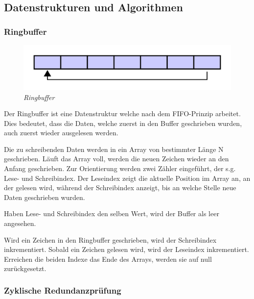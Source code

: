 \subsection{Datenstrukturen und Algorithmen}
\subsubsection{Ringbuffer}

\begin{figure}
     \vspace{-\baselineskip}
         \centering
         \includegraphics[scale=0.1]{Pictures/circular_buffer.png}
         \caption{\textit{Ringbuffer \citep{ImgBuffer}}}
         \label{img:Ringbuffer}
 \end{figure}

Der Ringbuffer ist eine Datenstruktur welche nach dem \acs{FIFO}-Prinzip arbeitet. Dies bedeutet, dass die Daten, welche
zuerst in den Buffer geschrieben wurden, auch zuerst wieder ausgelesen werden. 

\smallskip

Die zu schreibenden Daten werden in ein Array von bestimmter Länge N geschrieben. Läuft das Array voll, werden die neuen Zeichen
wieder an den Anfang geschrieben. Zur Orientierung werden zwei Zähler eingeführt, der s.g. Lese- und Schreibindex. Der Leseindex
zeigt die aktuelle Position im Array an, an der gelesen wird, während der Schreibindex anzeigt, bis an welche Stelle
neue Daten geschrieben wurden.  

Haben Lese- und Schreibindex den selben Wert, wird der Buffer als leer angesehen. 

\smallskip

Wird ein Zeichen in den Ringbuffer geschrieben, wird der Schreibindex inkrementiert. Sobald ein Zeichen gelesen wird, wird der Leseindex
inkrementiert. Erreichen die beiden Indexe das Ende des Arrays, werden sie auf null zurückgesetzt.


\subsubsection{Zyklische Redundanzprüfung}
\label{subsub: CRC16}


